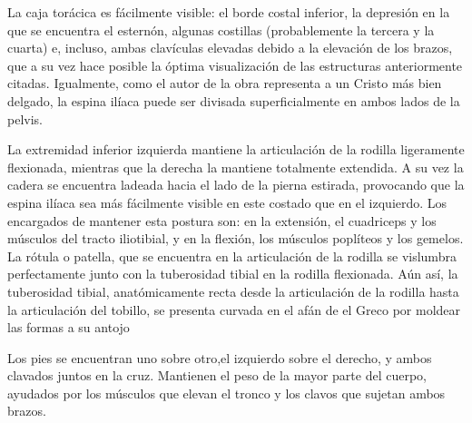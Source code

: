 La caja torácica es fácilmente visible: el borde costal inferior, la depresión en la que se encuentra el esternón, algunas costillas (probablemente la tercera y la cuarta) e, incluso, ambas clavículas elevadas debido a la elevación de los brazos, que a su vez hace posible la óptima visualización de las estructuras anteriormente citadas. Igualmente, como el autor de la obra representa a un Cristo más bien delgado, la espina ilíaca puede ser divisada superficialmente en ambos lados de la pelvis.

La extremidad inferior izquierda mantiene la articulación de la rodilla ligeramente flexionada, mientras que la derecha la mantiene totalmente extendida. A su vez la cadera se encuentra ladeada hacia el lado de la pierna estirada, provocando que la espina ilíaca sea más fácilmente visible en este costado que en el izquierdo.
Los encargados de mantener esta postura son: en la extensión, el cuadriceps y los músculos del tracto iliotibial, y en la flexión, los músculos poplíteos y los gemelos. La rótula o patella, que se encuentra en la articulación de la rodilla se vislumbra perfectamente junto con la tuberosidad tibial en la rodilla flexionada. Aún así, la tuberosidad tibial, anatómicamente recta desde la articulación de la rodilla hasta la articulación del tobillo, se presenta curvada en el afán de el Greco por moldear las formas a su antojo

Los pies se encuentran uno sobre otro,el izquierdo sobre el derecho, y ambos clavados juntos en la cruz. Mantienen el peso de la mayor parte del cuerpo, ayudados por los músculos que elevan el tronco y los clavos que sujetan ambos brazos.